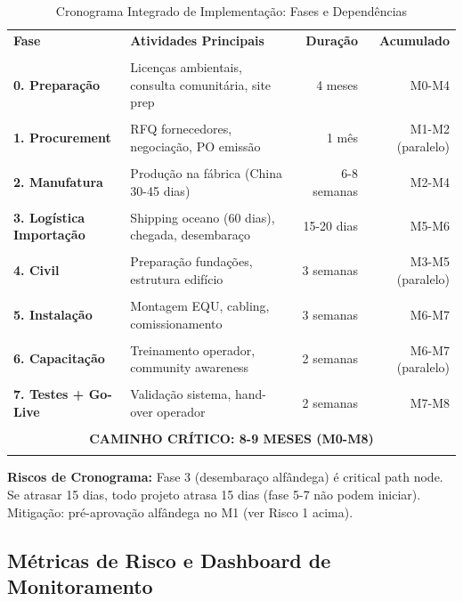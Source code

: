\documentclass[12pt, a4paper]{article}
\begin{document}
\begin{table}[H]
\centering
\caption{Cronograma Integrado de Implementação: Fases e Dependências}
\label{tab:timeline}
\small
\begin{tabular}{llrr}
\toprule\textbf{Fase} &\textbf{Atividades Principais} &\textbf{Duração} &\textbf{Acumulado} \\\\
\midrule\textbf{0. Preparação} & Licenças ambientais, consulta comunitária, site prep & 4 meses & M0-M4 \\\\
\midrule\textbf{1. Procurement} & RFQ fornecedores, negociação, PO emissão & 1 mês & M1-M2 (paralelo) \\\\
\midrule\textbf{2. Manufatura} & Produção na fábrica (China 30-45 dias) & 6-8 semanas & M2-M4 \\\\
\midrule\textbf{3. Logística Importação} & Shipping oceano (60 dias), chegada, desembaraço & 15-20 dias & M5-M6 \\\\
\midrule\textbf{4. Civil} & Preparação fundações, estrutura edifício & 3 semanas & M3-M5 (paralelo) \\\\
\midrule\textbf{5. Instalação} & Montagem EQU, cabling, comissionamento & 3 semanas & M6-M7 \\\\
\midrule\textbf{6. Capacitação} & Treinamento operador, community awareness & 2 semanas & M6-M7 (paralelo) \\\\
\midrule\textbf{7. Testes + Go-Live} & Validação sistema, hand-over operador & 2 semanas & M7-M8 \\\\
\midrule
\multicolumn{4}{c}{\textbf{CAMINHO CRÍTICO: 8-9 MESES (M0-M8)}} \\\\
\bottomrule
\end{tabular}
\end{table}\textbf{Riscos de Cronograma:} Fase 3 (desembaraço alfândega) é critical path node. Se atrasar 15 dias, todo projeto atrasa 15 dias (fase 5-7 não podem iniciar). Mitigação: pré-aprovação alfândega no M1 (ver Risco 1 acima).

\subsection{Métricas de Risco e Dashboard de Monitoramento}
\end{document}
